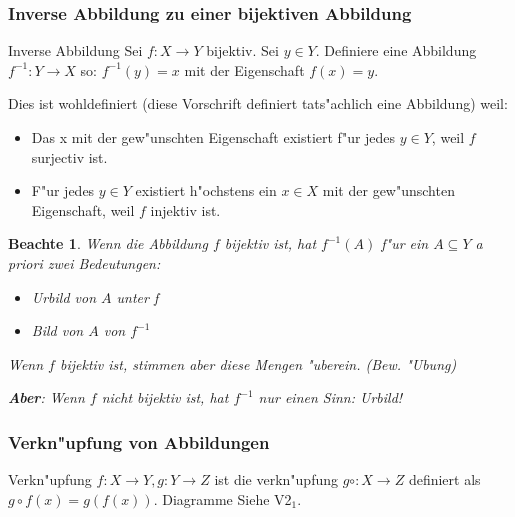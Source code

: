 \documentclass[11pt]{article}
\newtheorem*{notte}{Beachte}
\begin{document}
\subsubsection{Inverse Abbildung zu einer bijektiven Abbildung}
\label{sec:orgaae7124}
\begin{definition}{Inverse Abbildung}{}
Sei \(f:X\to Y\) bijektiv. Sei \(y\in Y\). Definiere eine Abbildung \(f^{-1}:
Y\to X\) so: \(f^{-1}(y)=x\) mit der Eigenschaft \(f(x)=y\).
\end{definition}

Dies ist wohldefiniert (diese Vorschrift definiert tats"achlich eine Abbildung)
weil:

\begin{relation}
\begin{itemize}
\item Das x mit der gew"unschten Eigenschaft existiert f"ur jedes \(y\in Y\), weil
\(f\) surjectiv ist.
\item F"ur jedes \(y\in Y\) existiert h"ochstens ein \(x\in X\) mit der gew"unschten
Eigenschaft, weil \(f\) injektiv ist.
\end{itemize}
\end{relation}

\begin{notte}
Wenn die Abbildung \(f\) bijektiv ist, hat \(f^{-1}(A)\) f"ur ein \(A\subseteq Y\) a
priori zwei Bedeutungen:
\begin{itemize}
\item Urbild von \(A\) unter f
\item Bild von \(A\) von \(f^{-1}\)
\end{itemize}

Wenn \(f\) bijektiv ist, stimmen aber diese Mengen "uberein. (Bew. "Ubung)

\textbf{Aber}: Wenn \(f\) nicht bijektiv ist, hat \(f^{-1}\) nur einen Sinn: Urbild!
\end{notte}

\subsubsection{Verkn"upfung von Abbildungen}
\label{sec:org540b965}
\begin{definition}{Verkn"upfung}{}
\(f: X\to Y, g: Y\to Z\) ist die verkn"upfung \(g\circ: X\to Z\) definiert
als \(g\circ f(x)=g(f(x))\). Diagramme Siehe V2\(_{\text{1}}\).
\end{definition}
\end{document}
